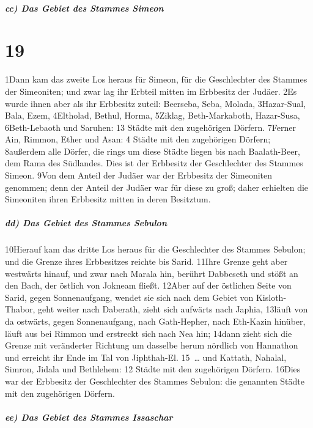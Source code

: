\hypertarget{cc-das-gebiet-des-stammes-simeon}{%
\subparagraph{cc) Das Gebiet des Stammes
Simeon}\label{cc-das-gebiet-des-stammes-simeon}}

\hypertarget{section-18}{%
\section{19}\label{section-18}}

1Dann kam das zweite Los heraus für Simeon, für die Geschlechter des
Stammes der Simeoniten; und zwar lag ihr Erbteil mitten im Erbbesitz der
Judäer. 2Es wurde ihnen aber als ihr Erbbesitz zuteil: Beerseba, Seba,
Molada, 3Hazar-Sual, Bala, Ezem, 4Eltholad, Bethul, Horma, 5Ziklag,
Beth-Markaboth, Hazar-Susa, 6Beth-Lebaoth und Saruhen: 13 Städte mit den
zugehörigen Dörfern. 7Ferner Ain, Rimmon, Ether und Asan: 4 Städte mit
den zugehörigen Dörfern; 8außerdem alle Dörfer, die rings um diese
Städte liegen bis nach Baalath-Beer, dem Rama des Südlandes. Dies ist
der Erbbesitz der Geschlechter des Stammes Simeon. 9Von dem Anteil der
Judäer war der Erbbesitz der Simeoniten genommen; denn der Anteil der
Judäer war für diese zu groß; daher erhielten die Simeoniten ihren
Erbbesitz mitten in deren Besitztum.

\hypertarget{dd-das-gebiet-des-stammes-sebulon}{%
\subparagraph{dd) Das Gebiet des Stammes
Sebulon}\label{dd-das-gebiet-des-stammes-sebulon}}

10Hierauf kam das dritte Los heraus für die Geschlechter des Stammes
Sebulon; und die Grenze ihres Erbbesitzes reichte bis Sarid. 11Ihre
Grenze geht aber westwärts hinauf, und zwar nach Marala hin, berührt
Dabbeseth und stößt an den Bach, der östlich von Jokneam fließt. 12Aber
auf der östlichen Seite von Sarid, gegen Sonnenaufgang, wendet sie sich
nach dem Gebiet von Kisloth-Thabor, geht weiter nach Daberath, zieht
sich aufwärts nach Japhia, 13läuft von da ostwärts, gegen Sonnenaufgang,
nach Gath-Hepher, nach Eth-Kazin hinüber, läuft aus bei Rimmon und
erstreckt sich nach Nea hin; 14dann zieht sich die Grenze mit
veränderter Richtung um dasselbe herum nördlich von Hannathon und
erreicht ihr Ende im Tal von Jiphthah-El. 15~\ldots{} und Kattath,
Nahalal, Simron, Jidala und Bethlehem: 12 Städte mit den zugehörigen
Dörfern. 16Dies war der Erbbesitz der Geschlechter des Stammes Sebulon:
die genannten Städte mit den zugehörigen Dörfern.

\hypertarget{ee-das-gebiet-des-stammes-issaschar}{%
\subparagraph{ee) Das Gebiet des Stammes
Issaschar}\label{ee-das-gebiet-des-stammes-issaschar}}


